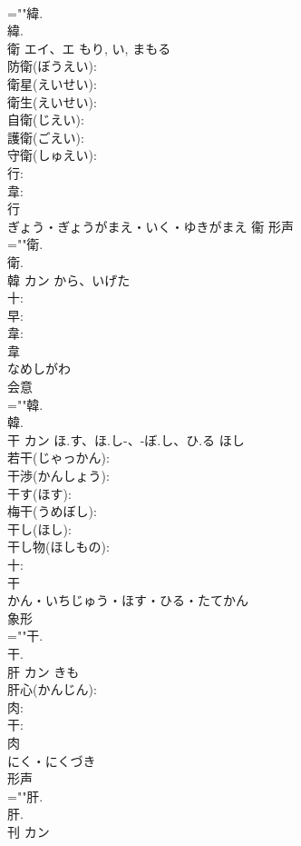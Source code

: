 \documentclass[8pt]{extreport}
\begin{document}
\begin{CJK}{UTF8}{min}
\\	=""緯.
\\	緯.
\\	衛	エイ、エ		もり, い, まもる	
\\	防衛(ぼうえい): 
\\	衛星(えいせい): 
\\	衛生(えいせい): 
\\	自衛(じえい): 
\\	護衛(ごえい): 
\\	守衛(しゅえい): 
\\	行: 
\\	韋: 
\\	行	
\\	ぎょう・ぎょうがまえ・いく・ゆきがまえ	衞	形声 
\\	=""衛.
\\	衛.
\\	韓	カン	から、いげた		
\\	十: 
\\	早: 
\\	韋: 
\\	韋	
\\	なめしがわ	
\\	会意 
\\	=""韓.
\\	韓.
\\	干	カン	ほ.す、ほ.し-、-ぼ.し、ひ.る	ほし	
\\	若干(じゃっかん): 
\\	干渉(かんしょう): 
\\	干す(ほす): 
\\	梅干(うめぼし): 
\\	干し(ほし): 
\\	干し物(ほしもの): 
\\	十: 
\\	干	
\\	かん・いちじゅう・ほす・ひる・たてかん	
\\	象形 
\\	=""干.
\\	干.
\\	肝	カン	きも		
\\	肝心(かんじん): 
\\	肉: 
\\	干: 
\\	肉	
\\	にく・にくづき	
\\	形声 
\\	=""肝.
\\	肝.
\\	刊	カン			

\end{CJK}
\end{document}
